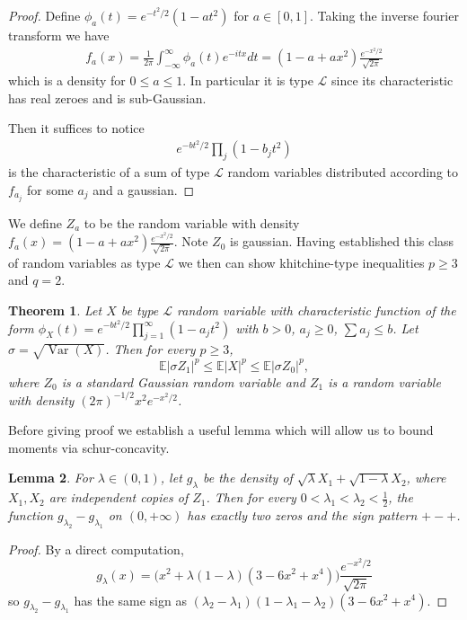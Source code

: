 \documentclass[10pt]{article}
\newcommand{\E}{\mathbb{E}}
\newcommand{\1}{\textbf{1}}
\DeclareMathOperator{\Var}{Var}
\newtheorem{theorem}{Theorem}
\newtheorem{lemma}[theorem]{Lemma}
\theoremstyle{remark}
\theoremstyle{definition}
\begin{document}
\begin{proof}
	Define $\phi_a(t) = e^{-t^2/2}(1-at^2)$ for $a \in [0,1]$. Taking the inverse fourier transform we have
	\begin{align*}
		f_a(x) = \frac{1}{2\pi}\int_{-\infty}^{\infty}\phi_a(t)e^{-itx}dt = (1-a+ax^2)\frac{e^{-x^2/2}}{\sqrt{2\pi}}
	\end{align*}
	which is a density for $0 \leq a \leq 1$. In particular it is type $\mathcal{L}$ since its characteristic has real zeroes and is sub-Gaussian.

	Then it suffices to notice 
	\begin{align*}
		e^{-bt^2/2}\prod_j (1-b_jt^2)
	\end{align*} 
	is the characteristic of a sum of type $\mathcal{L}$ random variables distributed according to $f_{a_j}$ for some $a_j$ and a gaussian. 
\end{proof}

We define $Z_a$ to be the random variable with density $f_a(x) = (1-a+ax^2)\frac{e^{-x^2/2}}{\sqrt{2\pi}}$. Note $Z_0$ is gaussian. Having established this class of random variables as type $\mathcal{L}$ we then can show khitchine-type inequalities $p \geq 3$ and $q=2$. 

\begin{theorem}
Let $X$ be type $\mathcal{L}$ random variable with characteristic function of the form $\phi_X(t) = e^{-b t^2/2}\prod_{j=1}^\infty(1-a_jt^2)$ with $b > 0$, $a_j \geq 0$, $\sum a_j \leq b$. Let $\sigma = \sqrt{\Var(X)}$. Then for every $p \geq 3$, 
\[
\E|\sigma Z_1|^p \leq \E|X|^p \leq \E|\sigma Z_0|^p,\]
where $Z_0$ is a standard Gaussian random variable and $Z_1$ is a random variable with density $(2\pi)^{-1/2}x^2e^{-x^2/2}$.
\end{theorem}

Before giving proof we establish a useful lemma which will allow us to bound moments via schur-concavity.

\begin{lemma}\label{lm:interlacing}
For $\lambda \in (0,1)$, let $g_\lambda$ be the density of $\sqrt{\lambda}X_1 + \sqrt{1-\lambda}X_2$, where $X_1, X_2$ are independent copies of $Z_1$. Then for every $0 < \lambda_1 < \lambda_2 < \frac{1}{2}$, the function $g_{\lambda_2} - g_{\lambda_1}$ on $(0,+\infty)$ has exactly two zeros and the sign pattern $+-+$.
\end{lemma}
\begin{proof}
By a direct computation, 
\[g_\lambda(x) = \Big(x^2+\lambda(1-\lambda)(3-6x^2+x^4)\Big)\frac{e^{-x^2/2}}{\sqrt{2\pi}}
\]
so $g_{\lambda_2} - g_{\lambda_1}$ has the same sign as $(\lambda_2-\lambda_1)(1-\lambda_1-\lambda_2)(3-6x^2+x^4)$.
\end{proof}
\end{document}
